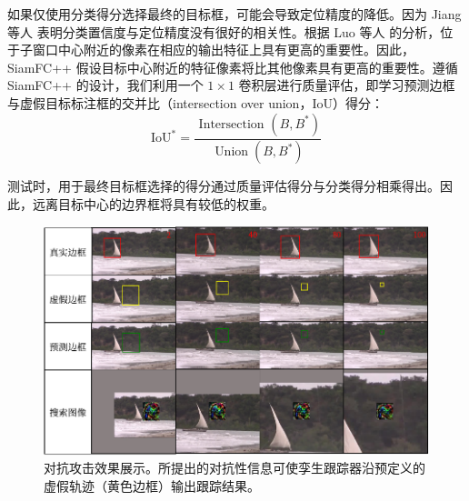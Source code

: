 如果仅使用分类得分选择最终的目标框，可能会导致定位精度的降低。因为 Jiang 等人 \cite{IoU-Net} 表明分类置信度与定位精度没有很好的相关性。根据 Luo 等人 \cite{ERF} 的分析，位于子窗口中心附近的像素在相应的输出特征上具有更高的重要性。因此，SiamFC++ 假设目标中心附近的特征像素将比其他像素具有更高的重要性。遵循 SiamFC++ 的设计，我们利用一个 $1 \times 1$ 卷积层进行质量评估，即学习预测边框与虚假目标标注框的交并比（intersection over union，IoU）得分：
\begin{equation}
\mathrm{IoU}^{*}=\frac{\text { Intersection }\left(B, B^{*}\right)}{\operatorname{Union}\left(B, B^{*}\right)}
\end{equation}

测试时，用于最终目标框选择的得分通过质量评估得分与分类得分相乘得出。因此，远离目标中心的边界框将具有较低的权重。

\begin{figure}[t]
\centering
\includegraphics[width=1.0\textwidth]{Img/attack/vis_v4.pdf}
\caption{对抗攻击效果展示。所提出的对抗性信息可使孪生跟踪器沿预定义的虚假轨迹（黄色边框）输出跟踪结果。}
\label{fig:attack_vis}
\end{figure}

